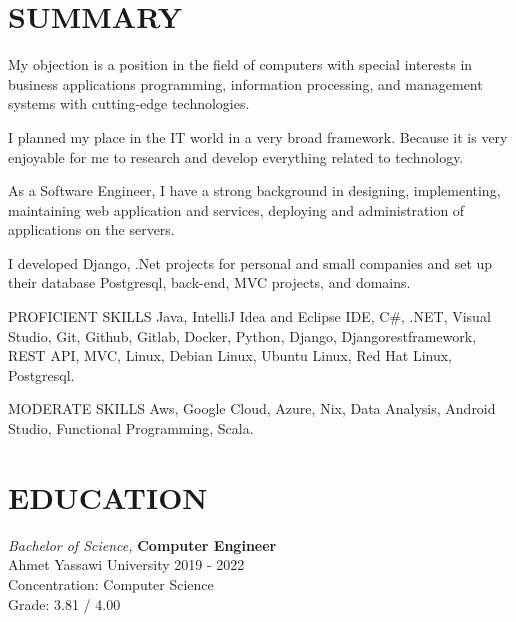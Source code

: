 \documentclass[line,margin]{res}
\begin{document}
\address{emre.yildiz.dev@hotmail.com}
\address{\href{https://linkedin.com/in/emre-yildiz-297ab0242}{https://linkedin.com/in/emre-yildiz-297ab0242}} 


 
\begin{resume}
 
\section{SUMMARY}   My objection is a position in the field of computers with special 
                interests in business applications programming, 
                information processing, and management systems with cutting-edge technologies. 
                
I planned my place in the IT world in a very broad framework. Because it is very enjoyable for me to research and develop everything related to technology.

As a Software Engineer, I have a strong background in designing, implementing, maintaining web application and services, deploying and administration of applications  on the servers.

I developed Django, .Net projects for personal and small companies and set up their database Postgresql, back-end, MVC projects, and domains.

PROFICIENT SKILLS
Java, IntelliJ Idea and Eclipse IDE, C#, .NET, Visual Studio, Git, Github, Gitlab, Docker, Python, Django, Djangorestframework, REST API, MVC, Linux, Debian Linux, Ubuntu Linux, Red Hat Linux, Postgresql.

MODERATE SKILLS
Aws, Google Cloud, Azure, Nix, Data Analysis, Android Studio, Functional Programming, Scala.
 
 
\section{EDUCATION} {\sl Bachelor of Science,} \textbf{Computer Engineer} \\
                Ahmet Yassawi University 
                2019 - 2022 \\
                Concentration: Computer Science \\
                Grade: 3.81 / 4.00 


\end{resume}
\end{document}
